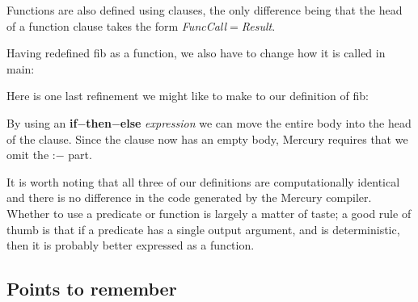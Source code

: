 \documentclass[a4paper,11pt,notitlepage,onecolumn]{book}
\begin{document}
Functions are also defined using clauses, the only difference being that the
head of a function clause takes the form \emph{FuncCall}\textsf{{\ensuremath{=}}}\emph{Result}.

Having redefined \textsf{fib} as a function, we also have to change how it is
called in \textsf{main}:
\begin{small}

\begin{ptabular}
\nextline
{}
\nextline
{}
\nextline
{}
\nextline
\end{ptabular}

\end{small}

Here is one last refinement we might like to make to our
definition of \textsf{fib}:
\begin{small}

\begin{ptabular}
\nextline
\end{ptabular}

\end{small}
By using an \textsf{\textbf{if}{\ensuremath{-}}\textbf{then}{\ensuremath{-}}\textbf{else}} \emph{expression} we can move the entire body
into the head of the clause.  Since the clause now has an empty body,
Mercury requires that we omit the \textsf{:{\ensuremath{-}}} part.

It is worth noting that all three of our definitions are computationally
identical and there is no difference in the code generated by the
Mercury compiler.  Whether to use a predicate or function is largely a
matter of taste; a good rule of thumb is that if a predicate has a single
output argument, and is deterministic, then it is probably better expressed
as a function.

\subsection*{Points to remember}
\end{document}
